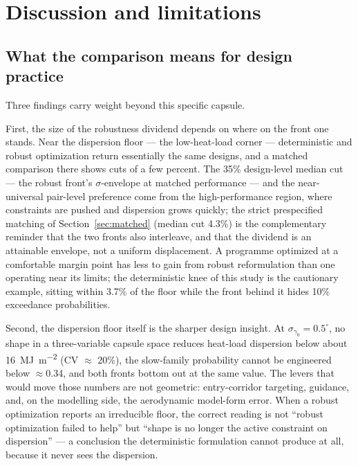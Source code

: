 \section{Discussion and limitations}
\label{sec:discussion}

\subsection{What the comparison means for design practice}
\label{sec:practice}

Three findings carry weight beyond this specific capsule.

First, the size of the robustness dividend depends on where on the front
one stands. Near the dispersion floor --- the low-heat-load corner ---
deterministic and robust optimization return essentially the same designs,
and a matched comparison there shows cuts of a few percent. The 35\%
design-level median cut --- the robust front's $\sigma$-envelope at
matched performance --- and the near-universal pair-level preference
come from the high-performance region, where constraints are pushed and
dispersion grows quickly; the strict prespecified matching of
Section~\ref{sec:matched} (median cut 4.3\%) is the complementary
reminder that the two fronts also interleave, and that the dividend is
an attainable envelope, not a uniform displacement. A programme
optimized at a comfortable margin
point has less to gain from robust reformulation than one operating near
its limits; the deterministic knee of this study is the cautionary
example, sitting within 3.7\% of the floor while the front behind it hides
10\% exceedance probabilities.

Second, the dispersion floor itself is the sharper design insight. At
$\sigma_{\gamma_0}=0.5^\circ$, no shape in a three-variable capsule space
reduces heat-load dispersion below about \SI{16}{\mega\joule\per\square\metre}
(CV $\approx$ 20\%), the slow-family probability cannot be engineered
below $\approx$0.34, and both fronts bottom out at the same value. The
levers that would move those numbers are not geometric: entry-corridor
targeting, guidance, and, on the modelling side, the aerodynamic
model-form error. When a robust optimization reports an irreducible floor,
the correct reading is not ``robust optimization failed to help'' but
``shape is no longer the active constraint on dispersion'' --- a
conclusion the deterministic formulation cannot produce at all, because it
never sees the dispersion.

